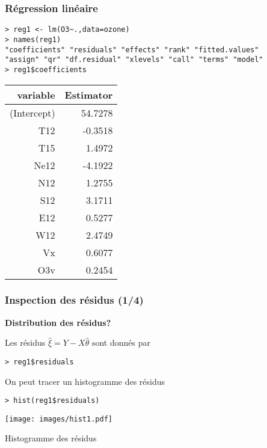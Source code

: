 \documentclass{beamer}
\begin{document}
\begin{frame}[fragile]
\frametitle{\bf R\'egression lin\'eaire}
\begin{small}
\begin{verbatim}
> reg1 <- lm(O3~.,data=ozone)
> names(reg1)
"coefficients" "residuals" "effects" "rank" "fitted.values"
"assign" "qr" "df.residual" "xlevels" "call" "terms" "model"  
> reg1$coefficients       
\end{verbatim}
\begin{tabular}{r|r}
variable & Estimator \\ 
  \hline
(Intercept) & 54.7278  \\ 
  T12 & -0.3518  \\ 
  T15 & 1.4972  \\ 
  Ne12 & -4.1922  \\ 
  N12 & 1.2755  \\ 
  S12 & 3.1711  \\ 
  E12 & 0.5277  \\ 
  W12 & 2.4749  \\ 
  Vx & 0.6077 \\ 
  O3v & 0.2454  
\end{tabular}
\end{small}
\end{frame}

\begin{frame}[fragile]
\frametitle{\bf Inspection des r\'esidus (1/4)}
\begin{minipage}{5cm}
{\bf Distribution des r\'esidus?}\bigskip

Les r\'esidus $\hat \xi=Y-X\hat\theta$ sont donn\'es par 
\begin{verbatim}> reg1$residuals\end{verbatim}
\medskip

On peut tracer un histogramme des r\'esidus
\begin{verbatim}> hist(reg1$residuals)\end{verbatim}
\end{minipage}\hfill
\begin{minipage}{5.5cm}
\begin{center}
\texttt{[image: images/hist1.pdf]}

Histogramme des r\'esidus
\end{center}
\end{minipage}
\end{frame}
\end{document}
